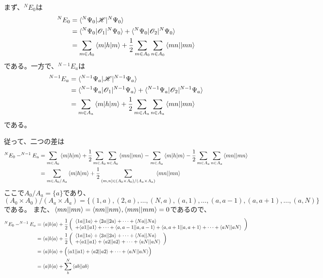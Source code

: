 まず、$^{N}E_0$は
\begin{align}
	^{N}E_0
&=
	\braket{^{N}\Psi_0|\H|^{N}\Psi_0} \\
%
%
&=
	\braket{^{N}\Psi_0|\Oone|^{N}\Psi_0}
	+
	\braket{^{N}\Psi_0|\Otwo|^{N}\Psi_0} \\
%
%
&=
	\sum_{m\in A_0}
		\braket{m|h|m}
	+
	\frac{1}{2}
	\sum_{m\in A_0}
	\sum_{n\in A_0}
		\antitwo{mn}{mn}
\end{align}
である。一方で、$^{N-1}E_a$は
\begin{align}
	^{N-1}E_a
&=
	\braket{^{N-1}\Psi_a|\H|^{N-1}\Psi_a} \\
%
%
&=
	\braket{^{N-1}\Psi_a|\Oone|^{N-1}\Psi_a}
	+
	\braket{^{N-1}\Psi_a|\Otwo|^{N-1}\Psi_a} \\
%
%
&=
	\sum_{m\in A_a}
		\braket{m|h|m}
	+
	\frac{1}{2}
	\sum_{m\in A_a}
	\sum_{n\in A_a}
		\antitwo{mn}{mn}
\end{align}
である。

従って、二つの差は
\begin{align}
	^{N}E_0
	-
	^{N-1}E_a
&=
	\sum_{m\in A_0}
		\braket{m|h|m}
	+
	\frac{1}{2}
	\sum_{m\in A_0}
	\sum_{n\in A_0}
		\antitwo{mn}{mn}
	-
	\sum_{m\in A_a}
		\braket{m|h|m}
	-
	\frac{1}{2}
	\sum_{m\in A_a}
	\sum_{n\in A_a}
		\antitwo{mn}{mn} \\
%
%
&=
	\sum_{m\in A_0/A_a}
		\braket{m|h|m}
	+
	\frac{1}{2}
	\sum_{(m,n)\in (A_0\times A_0) / (A_a\times A_a)}
		\antitwo{mn}{mn}
\end{align}
ここで$A_0/A_a=\{a\}$であり、
$(A_0\times A_0) / (A_a\times A_a) =\{(1,a),(2,a),\dots,(N,a),(a,1),\dots,(a,a-1),(a,a+1),\dots,(a,N)\}$である。
また、${\braket{mn||mn}}={\braket{nm||nm}},{\braket{mm||mm}}=0$であるので、
\begin{align}
		^{N}E_0
	-
	^{N-1}E_a
&=
	\braket{a|h|a}
	+
	\frac{1}{2}
	\left(
	\begin{array}{l}
		\antitwo{1a}{1a}
		+
		\antitwo{2a}{2a}
		+
		\dots
		+
		\antitwo{Na}{Na} \\
		+
		\antitwo{a1}{a1}
		+
		\dots
		+
		\antitwo{a,a-1}{a,a-1}
		+
		\antitwo{a,a+1}{a,a+1}
		+
		\dots
		+
		\antitwo{aN}{aN}
	\end{array}
	\right) \\
%
%
&=
	\braket{a|h|a}
	+
	\frac{1}{2}
	\left(
	\begin{array}{l}
		\antitwo{1a}{1a}
		+
		\antitwo{2a}{2a}
		+
		\dots
		+
		\antitwo{Na}{Na} \\
		+
		\antitwo{a1}{a1}
		+
		\antitwo{a2}{a2}
		+
		\dots
		+
		\antitwo{aN}{aN}
	\end{array}
	\right) \\
%
%
&=
	\braket{a|h|a}
	+
	\Bigl(
		\antitwo{a1}{a1}
		+
		\antitwo{a2}{a2}
		+
		\dots
		+
		\antitwo{aN}{aN}
	\Bigr) \\
%
%
&=
	\braket{a|h|a}
	+
	\sum_{b}^{N}
		\antitwo{ab}{ab}
\end{align}



